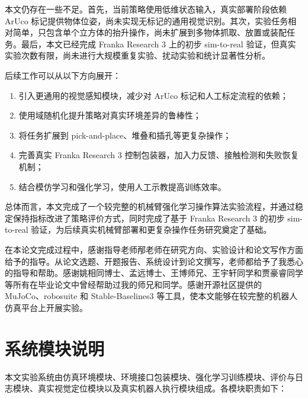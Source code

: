 \documentclass[
    type = bachelor,
    oneside,
    fontset = fandol
]{njuthesis}
\begin{document}
本文仍存在一些不足。首先，当前策略使用低维状态输入，真实部署阶段依赖 ArUco 标记提供物体位姿，尚未实现无标记的通用视觉识别。其次，实验任务相对简单，只包含单个立方体的抬升操作，尚未扩展到多物体抓取、放置或装配任务。最后，本文已经完成 Franka Research 3 上的初步 sim-to-real 验证，但真实实验次数有限，尚未进行大规模重复实验、扰动实验和统计显著性分析。

后续工作可以从以下方向展开：
\begin{enumerate}
  \item 引入更通用的视觉感知模块，减少对 ArUco 标记和人工标定流程的依赖；
  \item 使用域随机化提升策略对真实环境差异的鲁棒性；
  \item 将任务扩展到 pick-and-place、堆叠和插孔等更复杂操作；
  \item 完善真实 Franka Research 3 控制包装器，加入力反馈、接触检测和失败恢复机制；
  \item 结合模仿学习和强化学习，使用人工示教提高训练效率。
\end{enumerate}

总体而言，本文完成了一个较完整的机械臂强化学习操作算法实验流程，并通过稳定保持指标改进了策略评价方式，同时完成了基于 Franka Research 3 的初步 sim-to-real 验证，为后续真实机械臂部署和更复杂操作任务研究奠定了基础。

\printbibliography

\begin{acknowledgement}
在本论文完成过程中，感谢指导老师邴老师在研究方向、实验设计和论文写作方面给予的指导。从论文选题、开题报告、系统设计到论文撰写，老师都给予了我悉心的指导和帮助。感谢姚相同博士、孟远博士、王博师兄、王宇轩同学和贾豪睿同学等所有在毕业论文中曾经帮助过我的师兄和同学。感谢开源社区提供的 MuJoCo、robosuite 和 Stable-Baselines3 等工具，使本文能够在较完整的机器人仿真平台上开展实验。
\end{acknowledgement}

\appendix

\chapter{系统模块说明}

本文实验系统由仿真环境模块、环境接口包装模块、强化学习训练模块、评价与日志模块、真实视觉定位模块以及真实机器人执行模块组成。各模块职责如下：
\end{document}

